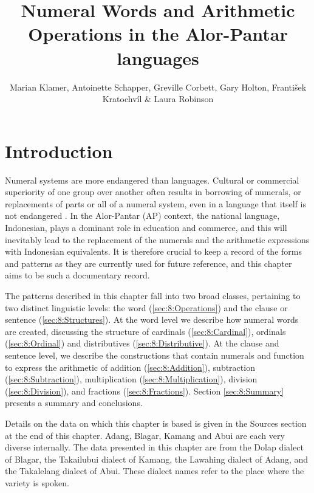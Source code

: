 \documentclass[output=paper]{LSP/langsci}
\title{Numeral Words and Arithmetic Operations in the Alor-Pantar languages}
\author{Marian Klamer, Antoinette Schapper, Greville Corbett, Gary Holton, František Kratochvíl \& Laura Robinson}
\begin{document}
\section{Introduction}
\label{sec:8:Introduction}
\hypertarget{Toc376958929}{}Numeral systems are more endangered than languages. Cultural or commercial superiority of one group over another often results in borrowing of numerals, or replacements of parts or all of a numeral system, even in a language that itself is not endangered \citep{Comrie2005numsys}. In the Alor-Pantar (AP) context, the national language, Indonesian, plays a dominant role in education and commerce, and this will inevitably lead to the replacement of the numerals and the arithmetic expressions with Indonesian equivalents. It is therefore crucial to keep a record of the forms and patterns as they are currently used for future reference, and this chapter aims to be such a documentary record. 


The patterns described in this chapter fall into two broad classes, pertaining to two distinct linguistic levels: the word (\ref{sec:8:Operations}) and the clause or sentence (\ref{sec:8:Structures}). At the word level we describe how numeral words are created, discussing the structure of cardinals (\ref{sec:8:Cardinal}), ordinals (\ref{sec:8:Ordinal}) and distributives (\ref{sec:8:Distributive}). At the clause and sentence level, we describe the constructions that contain numerals and function to express the arithmetic of addition (\ref{sec:8:Addition}), subtraction (\ref{sec:8:Subtraction}), multiplication (\ref{sec:8:Multiplication}), division (\ref{sec:8:Division}), and fractions (\ref{sec:8:Fractions}). Section \ref{sec:8:Summary} presents a summary and conclusions. 

Details on the data on which this chapter is based is given in the  Sources section at the end of this chapter. Adang, Blagar, Kamang and Abui are each very diverse internally. The data presented in this chapter are from the Dolap dialect of Blagar, the Takailubui dialect of Kamang, the Lawahing dialect of Adang, and the Takalelang dialect of Abui. These dialect names refer to the place where the variety is spoken.
\end{document}
